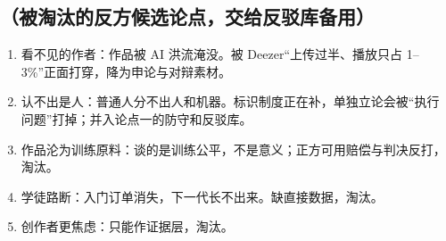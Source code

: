 \documentclass[prep,both]{debate}
\begin{document}
\subsection{（被淘汰的反方候选论点，交给反驳库备用）}
\begin{enumerate}[leftmargin=1.8em]
\item 看不见的作者：作品被 AI 洪流淹没。被 Deezer“上传过半、播放只占 1--3\%”正面打穿，降为申论与对辩素材。
\item 认不出是人：普通人分不出人和机器。标识制度正在补，单独立论会被“执行问题”打掉；并入论点一的防守和反驳库。
\item 作品沦为训练原料：谈的是训练公平，不是意义；正方可用赔偿与判决反打，淘汰。
\item 学徒路断：入门订单消失，下一代长不出来。缺直接数据，淘汰。
\item 创作者更焦虑：只能作证据层，淘汰。
\end{enumerate}
\end{document}
